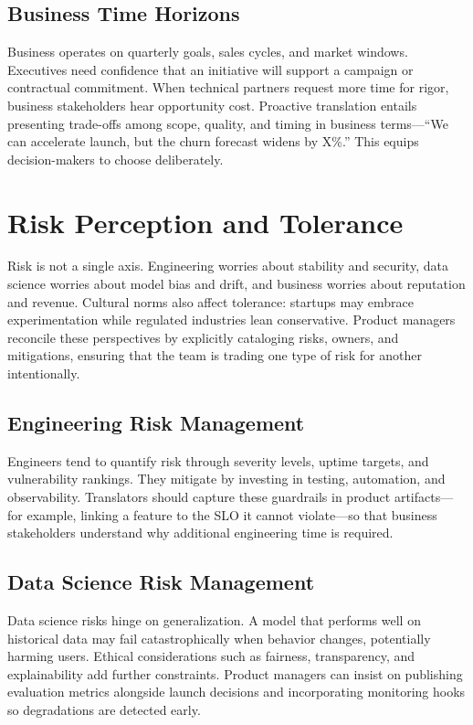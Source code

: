 \subsection{Business Time Horizons}
Business operates on quarterly goals, sales cycles, and market windows. Executives need confidence that an initiative will support a campaign or contractual commitment. When technical partners request more time for rigor, business stakeholders hear opportunity cost. Proactive translation entails presenting trade-offs among scope, quality, and timing in business terms—``We can accelerate launch, but the churn forecast widens by X\%.'' This equips decision-makers to choose deliberately.

\section{Risk Perception and Tolerance}
\label{sec:risk-perception}

Risk is not a single axis. Engineering worries about stability and security, data science worries about model bias and drift, and business worries about reputation and revenue. Cultural norms also affect tolerance: startups may embrace experimentation while regulated industries lean conservative. Product managers reconcile these perspectives by explicitly cataloging risks, owners, and mitigations, ensuring that the team is trading one type of risk for another intentionally.

\subsection{Engineering Risk Management}
Engineers tend to quantify risk through severity levels, uptime targets, and vulnerability rankings. They mitigate by investing in testing, automation, and observability. Translators should capture these guardrails in product artifacts—for example, linking a feature to the SLO it cannot violate—so that business stakeholders understand why additional engineering time is required.

\subsection{Data Science Risk Management}
Data science risks hinge on generalization. A model that performs well on historical data may fail catastrophically when behavior changes, potentially harming users. Ethical considerations such as fairness, transparency, and explainability add further constraints. Product managers can insist on publishing evaluation metrics alongside launch decisions and incorporating monitoring hooks so degradations are detected early.


